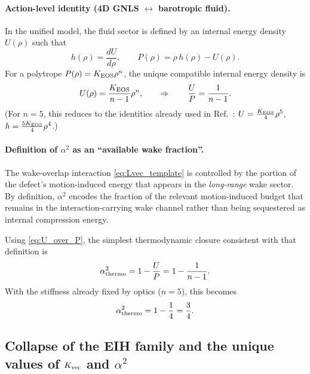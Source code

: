 \documentclass[11pt]{article}
\begin{document}
\paragraph{Action-level identity (4D GNLS \texorpdfstring{$\leftrightarrow$}{<->} barotropic fluid).}
In the unified model, the fluid sector is defined by an internal energy density $U(\rho)$ such that
\begin{equation}
  h(\rho)=\frac{dU}{d\rho},\qquad
  P(\rho)=\rho\,h(\rho)-U(\rho).
  \label{eq:thermo_identities}
\end{equation}
For a polytrope $P(\rho)=K_{\rm EOS}\rho^n$, the unique compatible internal energy density is
\begin{equation}
  U(\rho)=\frac{K_{\rm EOS}}{n-1}\rho^n,
  \qquad
  \Rightarrow\qquad
  \frac{U}{P}=\frac{1}{n-1}.
  \label{eq:U_over_P}
\end{equation}
(For $n=5$, this reduces to the identities already used in Ref.~\cite{norris2026_4d_model}:
$U=\tfrac{K_{\rm EOS}}{4}\rho^5$, $h=\tfrac{5K_{\rm EOS}}{4}\rho^4$.)

\paragraph{Definition of \texorpdfstring{$\alpha^2$}{alpha\string^2} as an ``available wake fraction''.}
The wake-overlap interaction \eqref{eq:Lvec_template} is controlled by the portion of the defect's
motion-induced energy that appears in the \emph{long-range} wake sector.
By definition, $\alpha^2$ encodes the fraction of the relevant motion-induced budget that remains
in the interaction-carrying wake channel rather than being sequestered as internal compression energy.

Using \eqref{eq:U_over_P}, the simplest thermodynamic closure consistent with that definition is
\begin{equation}
  \alpha^2_{\rm thermo}
  = 1-\frac{U}{P}
  =1-\frac{1}{n-1}.
  \label{eq:alpha_thermo_general}
\end{equation}
With the stiffness already fixed by optics ($n=5$), this becomes
\begin{equation}
  \alpha^2_{\rm thermo}=1-\frac{1}{4}=\frac{3}{4}.
  \label{eq:alpha_value}
\end{equation}

\subsection{Collapse of the EIH family and the unique values of \texorpdfstring{$K_{\rm vec}$}{K vec} and \texorpdfstring{$\alpha^2$}{alpha squared}}
\label{sec:1pn-interaction-collapse}
\end{document}
